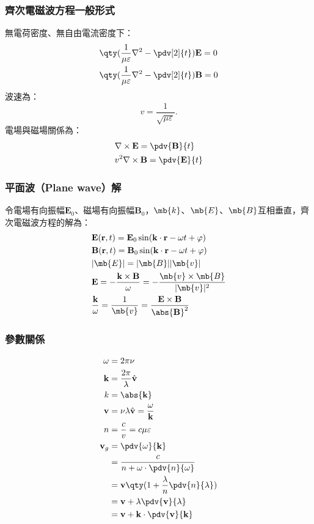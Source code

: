 \documentclass[a4paper,12pt]{report}
\begin{document}
\begin{itemize}
\subsubsection{齊次電磁波方程一般形式}
無電荷密度、無自由電流密度下：
\[\begin{aligned}
& \qty(\frac{1}{\mu\varepsilon}\nabla^2-\pdv[2]{t})\mathbf{E}=0\\
& \qty(\frac{1}{\mu\varepsilon}\nabla^2-\pdv[2]{t})\mathbf{B}=0
\end{aligned}\]
波速為：
\[v=\frac{1}{\sqrt{\mu\varepsilon}}.\]
電場與磁場關係為：
\[\begin{aligned}
&\nabla\times\mathbf{E}=\pdv{\mathbf{B}}{t}\\
&v^2\nabla\times\mathbf{B}=\pdv{\mathbf{E}}{t}
\end{aligned}\]
\subsubsection{平面波（Plane wave）解}
令電場有向振幅$\mathbf{E}_0$、磁場有向振幅$\mathbf{B}_0$，$\mb{k}$、$\mb{E}$、$\mb{B}$互相垂直，齊次電磁波方程的解為：
\[\begin{aligned}
&\mathbf{E}(\mathbf{r},t)=\mathbf{E}_0\sin(\mathbf{k}\cdot\mathbf{r}-\omega t+\varphi)\\
&\mathbf{B}(\mathbf{r},t)=\mathbf{B}_0\sin(\mathbf{k}\cdot\mathbf{r}-\omega t+\varphi)\\
&|\mb{E}|=|\mb{B}||\mb{v}|\\
&\mathbf{E}=-\frac{\mathbf{k}\times\mathbf{B}}{\omega}=-\frac{\mb{v}\times\mb{B}}{|\mb{v}|^2}\\
&\frac{\mathbf{k}}{\omega}=\frac{1}{\mb{v}}=\frac{\mathbf{E}\times\mathbf{B}}{\abs{\mathbf{B}}^2}
\end{aligned}\]
\subsubsection{參數關係}
\[\begin{aligned}
\omega &= 2\pi \nu \\
\mathbf{k} &= \frac{2\pi}{\lambda}\hat{\mathbf{v}} \\
k &= \abs{\mathbf{k}} \\
\mathbf{v} &= \nu \lambda \hat{\mathbf{v}} = \frac{\omega}{\mathbf{k}}\\
n &= \frac{c}{v} = c\mu\varepsilon\\
\mathbf{v}_g &= \pdv{\omega}{\mathbf{k}} \\
&= \frac{c}{n+\omega\cdot \pdv{n}{\omega}} \\
&= \mathbf{v}\qty(1+\frac{\lambda}{n} \pdv{n}{\lambda}) \\
&= \mathbf{v}+\lambda \pdv{\mathbf{v}}{\lambda} \\
&= \mathbf{v}+\mathbf{k} \cdot\pdv{\mathbf{v}}{\mathbf{k}}
\end{aligned}\]

\end{itemize}
\end{document}
